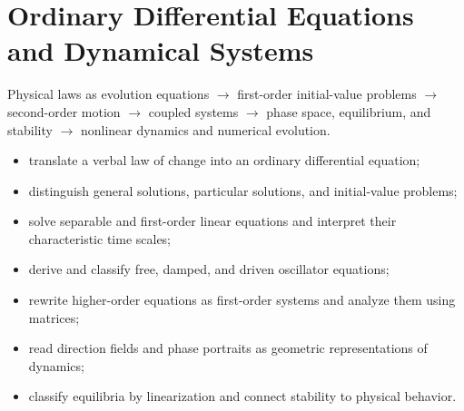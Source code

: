 \chapter{Ordinary Differential Equations and Dynamical Systems}
\label{chap:04-ordinary-differential-equations}

\begin{roadmapbox}
Physical laws as evolution equations $\longrightarrow$ first-order initial-value problems $\longrightarrow$ second-order motion $\longrightarrow$ coupled systems $\longrightarrow$ phase space, equilibrium, and stability $\longrightarrow$ nonlinear dynamics and numerical evolution.
\end{roadmapbox}

\learningobjectives
\begin{itemize}
\item translate a verbal law of change into an ordinary differential equation;
\item distinguish general solutions, particular solutions, and initial-value problems;
\item solve separable and first-order linear equations and interpret their characteristic time scales;
\item derive and classify free, damped, and driven oscillator equations;
\item rewrite higher-order equations as first-order systems and analyze them using matrices;
\item read direction fields and phase portraits as geometric representations of dynamics;
\item classify equilibria by linearization and connect stability to physical behavior.
\end{itemize}

\newpage







